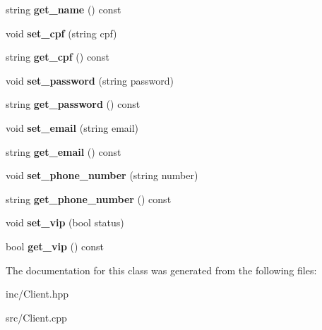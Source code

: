 \begin{DoxyCompactItemize}
\item 
\mbox{\label{class_client_ac5adda2be14420ded9389a3ba9f18adc}} 
string {\bfseries get\+\_\+name} () const
\item 
\mbox{\label{class_client_a4458d987d11afc26750870fa10fc8770}} 
void {\bfseries set\+\_\+cpf} (string cpf)
\item 
\mbox{\label{class_client_a63e87c345f982f90c50df0907af31ee2}} 
string {\bfseries get\+\_\+cpf} () const
\item 
\mbox{\label{class_client_a62ff918aca567c55f958339679ac1ca4}} 
void {\bfseries set\+\_\+password} (string password)
\item 
\mbox{\label{class_client_a5e4978500486f1771da5c0ed0c3bde11}} 
string {\bfseries get\+\_\+password} () const
\item 
\mbox{\label{class_client_a9cf2d94a079db098785f3f3310a5a0c5}} 
void {\bfseries set\+\_\+email} (string email)
\item 
\mbox{\label{class_client_af0c077005b996585a86905f452b89fb7}} 
string {\bfseries get\+\_\+email} () const
\item 
\mbox{\label{class_client_a695805264107340bb6fe54a4f7d7d37f}} 
void {\bfseries set\+\_\+phone\+\_\+number} (string number)
\item 
\mbox{\label{class_client_a50617baabfbf9c3c81aa01262608897b}} 
string {\bfseries get\+\_\+phone\+\_\+number} () const
\item 
\mbox{\label{class_client_abbbb76085690c3826003139c0cd41f2b}} 
void {\bfseries set\+\_\+vip} (bool status)
\item 
\mbox{\label{class_client_a05aac0dcb6cca28b3679e5caa35417e4}} 
bool {\bfseries get\+\_\+vip} () const
\end{DoxyCompactItemize}


The documentation for this class was generated from the following files\+:\begin{DoxyCompactItemize}
\item 
inc/Client.\+hpp\item 
src/Client.\+cpp\end{DoxyCompactItemize}
